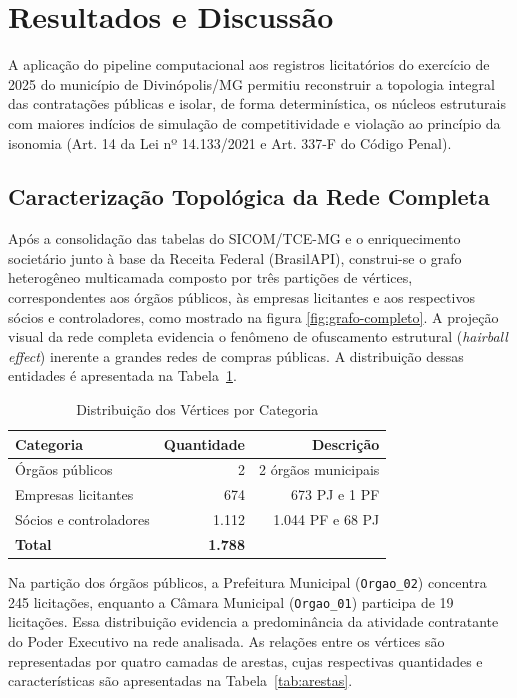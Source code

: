 \section{Resultados e Discussão}
\label{sec:resultados}

A aplicação do pipeline computacional aos registros licitatórios do exercício de 2025 do município de Divinópolis/MG permitiu reconstruir a topologia integral das contratações públicas e isolar, de forma determinística, os núcleos estruturais com maiores indícios de simulação de competitividade e violação ao princípio da isonomia (Art. 14 da Lei nº 14.133/2021 e Art. 337-F do Código Penal).

\subsection{Caracterização Topológica da Rede Completa}

Após a consolidação das tabelas do SICOM/TCE-MG e o enriquecimento societário junto à base da Receita Federal (BrasilAPI), construi-se o grafo heterogêneo multicamada composto por três partições de vértices, correspondentes aos órgãos públicos, às empresas licitantes e aos respectivos sócios e controladores, como mostrado na figura \ref{fig:grafo-completo}.  A projeção visual da rede completa evidencia o fenômeno de ofuscamento estrutural (\emph{hairball effect}) inerente a grandes redes de compras públicas. A
distribuição dessas entidades é apresentada na Tabela~\ref{tab:vertices}.
\begin{table}[!h]
  \centering
  \caption{Distribuição dos Vértices por Categoria}
  \label{tab:vertices}
  \footnotesize
  \begin{tabular}{lrr}
    \hline
    \textbf{Categoria} & \textbf{Quantidade} & \textbf{Descrição} \\
    \hline
    Órgãos públicos & 2 & 2 órgãos municipais \\
    Empresas licitantes & 674 & 673 PJ e 1 PF \\
    Sócios e controladores & 1.112 & 1.044 PF e 68 PJ \\
    \hline
    \textbf{Total} & \textbf{1.788} & \\
    \hline
  \end{tabular}
\end{table}

Na partição dos órgãos públicos, a Prefeitura Municipal (\texttt{Orgao\_02}) concentra 245 licitações, enquanto a
Câmara Municipal (\texttt{Orgao\_01}) participa de 19
licitações. Essa distribuição evidencia a predominância
da atividade contratante do Poder Executivo na rede analisada. 
As relações entre os vértices são representadas por quatro
camadas de arestas, cujas respectivas quantidades e características são apresentadas na Tabela~\ref{tab:arestas}.

